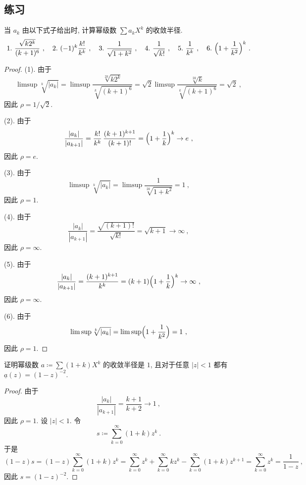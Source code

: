 \subsection{练习}

\begin{exercise}
    当 \(a_k\) 由以下式子给出时, 计算幂级数 \(\sum a_k X^k\) 的收敛半径.
    \[
        1.\ \frac{\sqrt{k 2^k}}{(k + 1)^6}\ ,\quad 2.\ (- 1)^k \frac{k!}{k^k}\ ,\quad 3.\ \frac{1}{\sqrt{1 + k^2}}\ ,\quad 4.\ \frac{1}{\sqrt{k!}}\ ,\quad 5.\ \frac{1}{k^k}\ ,\quad 6.\ \Bigl(1 + \frac{1}{k^2}\Bigr)^k\ .
    \]
\end{exercise}

\begin{proof}
    (1). 由于
    \[
        \limsup \sqrt[k]{|a_k|} = \limsup \frac{\sqrt[2 k]{k 2^k}}{\sqrt[k]{(k + 1)^6}} = \sqrt{2} \limsup \frac{\sqrt[2 k]{k}}{\sqrt[k]{(k + 1)^6}} = \sqrt{2}\ ,
    \]
    因此 \(\rho = 1 / \sqrt{2}\).

    (2). 由于
    \[
        \frac{|a_k|}{|a_{k + 1}|} = \frac{k!}{k^k}\, \frac{(k + 1)^{k + 1}}{(k + 1)!} = \Bigl(1 + \frac{1}{k}\Bigr)^k \to e\ ,
    \]
    因此 \(\rho = e\).

    (3). 由于
    \[
        \limsup \sqrt[k]{|a_k|} = \limsup \frac{1}{\sqrt[2 k]{1 + k^2}} = 1\ ,
    \]
    因此 \(\rho = 1\).

    (4). 由于
    \[
        \frac{|a_k|}{|a_{k + 1}|} = \frac{\sqrt{(k + 1)!}}{\sqrt{k!}} = \sqrt{k + 1} \to \infty\ ,
    \]
    因此 \(\rho = \infty\).

    (5). 由于
    \[
        \frac{|a_k|}{|a_{k + 1}|} = \frac{(k + 1)^{k + 1}}{k^k} = (k + 1) \Bigl(1 + \frac{1}{k}\Bigr)^k \to \infty\ ,
    \]
    因此 \(\rho = \infty\).

    (6). 由于
    \[
        \limsup \sqrt[k]{|a_k|} = \limsup \Bigl(1 + \frac{1}{k^2}\Bigr) = 1\ ,
    \]
    因此 \(\rho = 1\).
\end{proof}

\begin{exercise}
    证明幂级数 \(a \coloneqq \sum (1 + k) X^k\) 的收敛半径是 \(1\), 且对于任意 \(|z| < 1\) 都有 \(\underline a(z) = (1 - z)^{- 2}\).
\end{exercise}

\begin{proof}
    由于
    \[
        \frac{|a_k|}{|a_{k + 1}|} = \frac{k + 1}{k + 2} \to 1\ ,
    \]
    因此 \(\rho = 1\). 设 \(|z| < 1\). 令
    \[
        s \coloneqq \sum_{k = 0}^\infty (1 + k) z^k\ .
    \]
    于是
    \[
        (1 - z) s = (1 - z) \sum_{k = 0}^\infty (1 + k) z^k = \sum_{k = 0}^\infty z^k + \sum_{k = 0}^\infty k z^k - \sum_{k = 0}^\infty (1 + k) z^{k + 1} = \sum_{k = 0}^\infty z^k = \frac{1}{1 - z}\ ,
    \]
    因此 \(s = (1 - z)^{- 2}\).
\end{proof}

